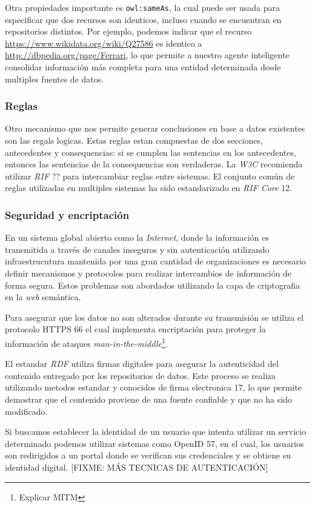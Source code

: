 Otra propiedades importante es \texttt{owl:sameAs}, la cual puede ser usada para
especificar que dos recursos son identicos, incluso cuando se encuentran en
repositorios distintos. Por ejemplo, podemos indicar que el recurso
\url{https://www.wikidata.org/wiki/Q27586} es identico a
\url{http://dbpedia.org/page/Ferrari}, lo que permite a nuestro agente
inteligente consolidar información más completa para una entidad determinada
desde multiples fuentes de datos.

\subsubsection{Reglas}

Otro mecanismo que nos permite generar conclusiones en base a datos existentes
son las regals logicas. Estas reglas estan compuestas de dos secciones,
antecedentes y consequencias: si se cumplen las sentencias en los antecedentes,
entonces las sentencias de la consequencias son verdaderas. La \textit{W3C}
recomienda utilizar \textit{RIF} ?? para intercambiar reglas entre sistemas. El
conjunto común de reglas utilizadas en multiples sistemas ha sido estandarizado
en \textit{RIF Core} 12.

\subsubsection{Seguridad y encriptación}

En un sistema global abierto como la \textit{Internet}, donde la información es
transmitida a través de canales inseguros y sin autenticación utilizando
infraestrucutura mantenida por una gran cantidad de organizaciones es necesario
definir mecanismos y protocolos para realizar intercambios de información de
forma segura. Estos problemas son abordados utilizando la capa de criptografia
en la \textit{web} semántica.

Para asegurar que los datos no son alterados durante su transmisión se utiliza
el protocolo HTTPS 66 el cual implementa encriptación para proteger la
información de ataques \textit{man-in-the-middle}\footnote{Explicar MITM}.

El estandar \textit{RDF} utiliza firmas digitales para asegurar la autenticidad
del contenido entregado por los repositorios de datos. Este proceso se realiza
utilizando metodos estandar y conocidos de firma electronica 17, lo que permite
demostrar que el contenido proviene de una fuente confiable y que no ha sido
modificado.

Si buscamos establecer la identidad de un usuario que intenta utilizar un
servicio determinado podemos utilizar sistemas como OpenID 57, en el cual, los
usuarios son redirigidos a un portal donde se verifican sus credenciales y se
obtiene su identidad digital. [FIXME: MÁS TECNICAS DE AUTENTICACIÓN]

